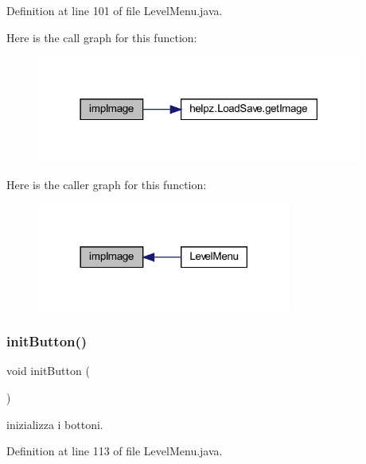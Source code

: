 Definition at line 101 of file Level\+Menu.\+java.

Here is the call graph for this function\+:
\nopagebreak
\begin{figure}[H]
\begin{center}
\leavevmode
\includegraphics[width=303pt]{classui_1_1_level_menu_aded9c531b53772fd90d09a8b6bf0132e_cgraph}
\end{center}
\end{figure}
Here is the caller graph for this function\+:\nopagebreak
\begin{figure}[H]
\begin{center}
\leavevmode
\includegraphics[width=237pt]{classui_1_1_level_menu_aded9c531b53772fd90d09a8b6bf0132e_icgraph}
\end{center}
\end{figure}
\mbox{\label{classui_1_1_level_menu_aed9fe7e919d4355a7ad86701d44e1fea}} 
\subsubsection{\texorpdfstring{init\+Button()}{initButton()}}
{\footnotesize\ttfamily void init\+Button (\begin{DoxyParamCaption}{ }\end{DoxyParamCaption})\hspace{0.3cm}{\ttfamily [private]}}



inizializza i bottoni. 



Definition at line 113 of file Level\+Menu.\+java.

